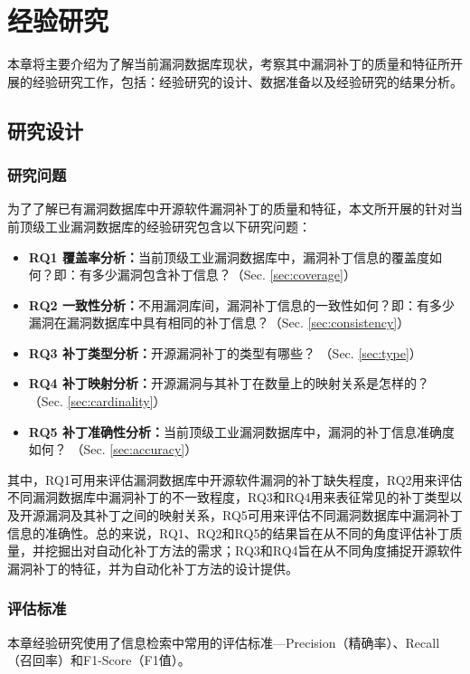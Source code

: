 \chapter{经验研究}\label{sec:study}

本章将主要介绍为了解当前漏洞数据库现状，考察其中漏洞补丁的质量和特征所开展的经验研究工作，包括：经验研究的设计、数据准备以及经验研究的结果分析。


\section{研究设计}
\subsection{研究问题}
为了了解已有漏洞数据库中开源软件漏洞补丁的质量和特征，本文所开展的针对当前顶级工业漏洞数据库的经验研究包含以下研究问题：

\begin{itemize}[leftmargin=*]
    \item \textbf{RQ1 覆盖率分析：}当前顶级工业漏洞数据库中，漏洞补丁信息的覆盖度如何？即：有多少漏洞包含补丁信息？（Sec. \ref{sec:coverage}）
    \item \textbf{RQ2 一致性分析：}不用漏洞库间，漏洞补丁信息的一致性如何？即：有多少漏洞在漏洞数据库中具有相同的补丁信息？（Sec. \ref{sec:consistency}）
    \item \textbf{RQ3 补丁类型分析：}开源漏洞补丁的类型有哪些？ （Sec. \ref{sec:type}）
    \item \textbf{RQ4 补丁映射分析：}开源漏洞与其补丁在数量上的映射关系是怎样的？ （Sec. \ref{sec:cardinality}）
    \item \textbf{RQ5 补丁准确性分析：}当前顶级工业漏洞数据库中，漏洞的补丁信息准确度如何？ （Sec. \ref{sec:accuracy}）
\end{itemize}
    
其中，RQ1可用来评估漏洞数据库中开源软件漏洞的补丁缺失程度，RQ2用来评估不同漏洞数据库中漏洞补丁的不一致程度，RQ3和RQ4用来表征常见的补丁类型以及开源漏洞及其补丁之间的映射关系，RQ5可用来评估不同漏洞数据库中漏洞补丁信息的准确性。总的来说，RQ1、RQ2和RQ5的结果旨在从不同的角度评估补丁质量，并挖掘出对自动化补丁方法的需求；RQ3和RQ4旨在从不同角度捕捉开源软件漏洞补丁的特征，并为自动化补丁方法的设计提供。

\subsection{评估标准}\label{sec:metric}
本章经验研究使用了信息检索中常用的评估标准---Precision（精确率）、Recall（召回率）和F1-Score（F1值）。


